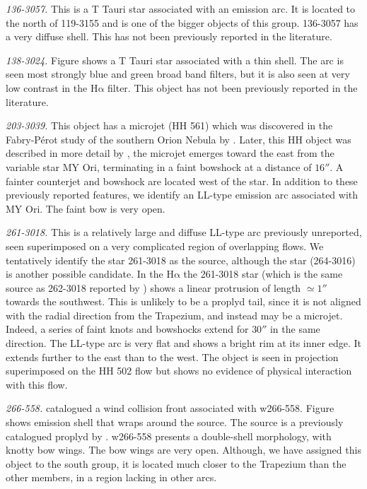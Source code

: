 \documentclass[iop, apj]{emulateapj}
\newcommand\ha{\ensuremath{\mathrm{H\alpha}}}
\begin{document}
\textit{136-3057.} This is a T Tauri star associated with an emission arc. It is located to the north of 119-3155 and is one of the bigger objects of this group. 136-3057 has a very diffuse shell. This has not been previously reported in the literature.

\textit{138-3024.} Figure shows a T Tauri star associated with a thin shell. The arc is seen most strongly blue and green broad band filters, but it is also seen at very low contrast in the \ha{} filter. This object has not been previously reported in the literature.

\textit{203-3039.} This object has a microjet (HH 561) which was discovered in the Fabry-Pérot study of the southern Orion Nebula by \citet{Bally:2001a}. Later, this HH object was described in more detail by \citet{Bally:2006a}, the microjet emerges toward the east from the variable star MY Ori, terminating in a faint bowshock at a distance of \(16''\). A fainter counterjet and bowshock are located west of the star. In addition to these previously reported features, we identify an LL-type emission arc associated with MY Ori. The faint bow is very open.

\textit{261-3018.} This is a relatively large and diffuse LL-type arc previously unreported, seen superimposed on a very complicated region of overlapping flows. We tentatively identify the star 261-3018 as the source, although the star (264-3016) is another possible candidate. In the \ha{} the 261-3018 star (which is the same source as 262-3018 reported by \citealp{Bally:2006a})  shows a linear protrusion of length \(\simeq1''\) towards the southwest. This is unlikely to be a proplyd tail, since it is not aligned with the radial direction from the Trapezium, and instead may be a microjet. Indeed, a series of faint knots and bowshocks extend for \(30''\) in the same direction. The LL-type arc is very flat and shows a bright rim at its inner edge. It extends further to the east than to the west. The object is seen in projection superimposed on the HH 502 flow but shows no evidence of physical interaction with this flow. 

\textit{266-558.} \citet{Bally:2000a} catalogued a wind collision front associated with w266-558. Figure shows emission shell that wraps around the source. The source is a previously catalogued proplyd by \citet{Ricci:2008a}. w266-558 presents a double-shell morphology, with knotty bow wings. The bow wings are very open. Although, we have assigned this object to the south group, it is located much closer to the Trapezium than the other members, in a region lacking in other arcs.
\end{document}
